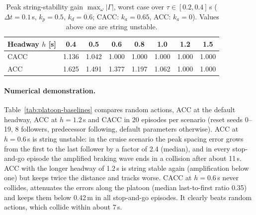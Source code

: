 \begin{table}[htbp]
  \centering\small
  \caption{Peak string-stability gain $\max_\omega |\Gamma|$, worst case over
    $\tau \in [0.2, 0.4]$\,s ($\Delta t = 0.1$\,s, $k_p = 0.5$, $k_d = 0.6$;
    CACC: $k_a = 0.65$, ACC: $k_a = 0$). Values above one are string unstable.}
  \label{tab:platoon-gain}
  \begin{tabular}{@{}lccccccc@{}}
    \toprule
    Headway $h$ [s] & 0.4 & 0.5 & 0.6 & 0.8 & 1.0 & 1.2 & 1.5 \\
    \midrule
    CACC & 1.136 & 1.042 & 1.000 & 1.000 & 1.000 & 1.000 & 1.000 \\
    ACC  & 1.625 & 1.491 & 1.377 & 1.197 & 1.062 & 1.000 & 1.000 \\
    \bottomrule
  \end{tabular}
\end{table}

\paragraph{Numerical demonstration.} Table~\ref{tab:platoon-baselines}
compares random actions, ACC at the default headway, ACC at $h = 1.2$\,s and
CACC in 20 episodes per scenario (reset seeds 0--19, 8 followers, predecessor
following, default parameters otherwise). ACC at $h = 0.6$\,s is string unstable:
in the cruise scenario the peak spacing error grows from the first to the last
follower by a factor of 2.4 (median), and in every stop-and-go episode the
amplified braking wave ends in a collision after about 11\,s. ACC with the
longer headway of 1.2\,s is string stable again (amplification below one) but
keeps twice the distance and tracks worse. CACC at $h = 0.6$\,s never collides,
attenuates the errors along the platoon (median last-to-first ratio 0.35) and
keeps them below 0.42\,m in all stop-and-go episodes. It clearly beats random
actions, which collide within about 7\,s.

